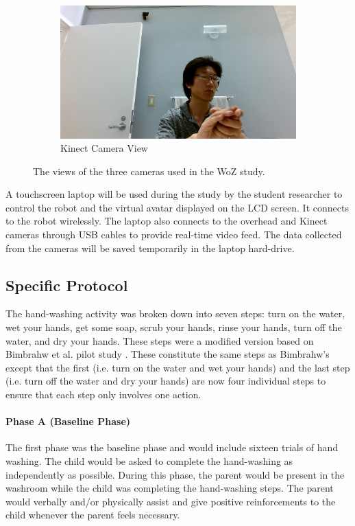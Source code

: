 \begin{figure}[h]
	
	\begin{subfigure}[b]{0.49\textwidth}
		\includegraphics[width=1.1\linewidth]{./img/kinect_view}
		\caption{Kinect Camera View}
	\end{subfigure}%
	\caption{The views of the three cameras used in the WoZ study.}
	\label{fig:CameraViews}
\end{figure}


A touchscreen laptop will be used during the study by the student researcher to control the robot and the virtual avatar displayed on the LCD screen. It connects to the robot wirelessly. The laptop also connects to the overhead and Kinect cameras through USB cables to provide real-time video feed. The data collected from the cameras will be saved temporarily in the laptop hard-drive. 

\subsection{Specific Protocol}
\label{sec:SpecificProtocol}
The hand-washing activity was broken down into seven steps: turn on the water, wet your hands, get some soap, scrub your hands, rinse your hands, turn off the water, and dry your hands.  These steps were a modified version based on Bimbrahw et al. pilot study \cite{bimbrahw2012investigating}. These constitute the same steps as Bimbrahw's except that the first (i.e. turn on the water and wet your hands) and the last step (i.e. turn off the water and dry your hands) are now four individual steps to ensure that each step only involves one action.

\paragraph{Phase A (Baseline Phase)}
The first phase was the baseline phase and would include sixteen trials of hand washing. The child would be asked to complete the hand-washing as independently as possible. During this phase, the parent would be present in the washroom while the child was completing the hand-washing steps. The parent would verbally and/or physically assist and give positive reinforcements to the child whenever the parent feels necessary.

